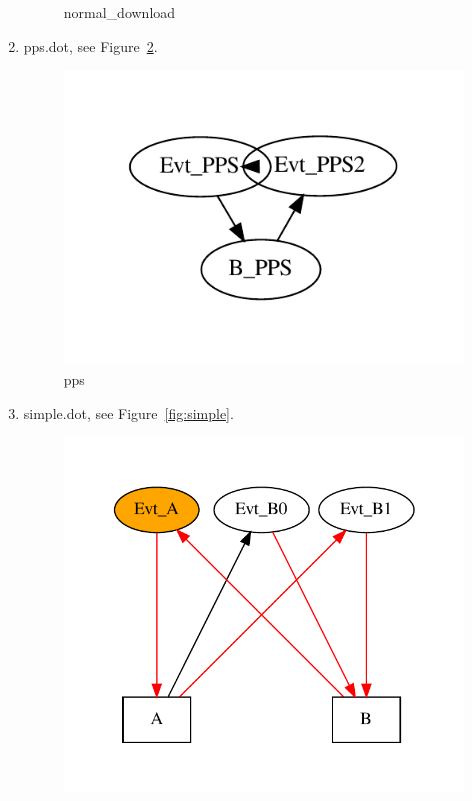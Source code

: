 \documentclass[12pt,a4paper]{report}
\begin{document}
\begin{enumerate}
\begin{figure}
        \caption{normal\_download}
        \label{fig:normal_download}
    \end{figure}
\item pps.dot, see Figure~\ref{fig:pps}.
    \begin{figure}
        \centering
        \includegraphics*[width=1.0\textwidth,keepaspectratio]{TestPattern/pps.pdf}
        \caption{pps}
        \label{fig:pps}
    \end{figure}
\item simple.dot, see Figure~\ref{fig:simple}.
    \begin{figure}
        \centering
        \includegraphics*[width=1.0\textwidth,keepaspectratio]{TestPattern/simple.pdf}

\end{figure}
\end{enumerate}
\end{document}
